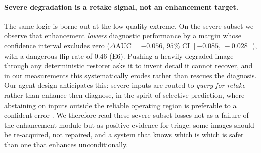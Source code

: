 \paragraph{Severe degradation is a retake signal, not an enhancement target.}
The same logic is borne out at the low-quality extreme. On the severe subset we
observe that enhancement \emph{lowers} diagnostic performance by a margin whose
confidence interval excludes zero ($\Delta\mathrm{AUC}=-0.056$, $95\%$ CI
$[-0.085,\,-0.028]$), with a dangerous-flip rate of $0.46$ (E6). Pushing a
heavily degraded image through any deterministic restorer asks it to invent
detail it cannot recover, and in our measurements this systematically erodes
rather than rescues the diagnosis. Our agent design anticipates this: severe
inputs are routed to \emph{query-for-retake} rather than enhance-then-diagnose,
in the spirit of selective prediction, where abstaining on inputs outside the
reliable operating region is preferable to a confident error
\citep{geifman2017selective}. We therefore read these severe-subset losses not
as a failure of the enhancement module but as positive evidence for triage: some
images should be re-acquired, not repaired, and a system that knows which is
which is safer than one that enhances unconditionally.
